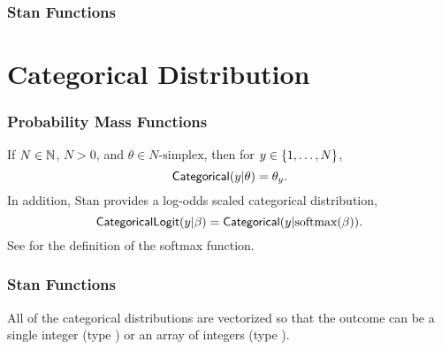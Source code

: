 
\subsubsection{Stan Functions}

\begin{description}
%

%
\end{description}
%
\begin{description}
\end{description}




\section{Categorical Distribution}

\subsubsection{Probability Mass Functions}

If $N \in \nats$, $N > 0$, and $\theta \in \mbox{$N$-simplex}$, then for $y \in
\setlist{1,\ldots,N}$, 
%
\[
\distro{Categorical}(y|\theta) = \theta_y.
\]
%
In addition, Stan provides a log-odds scaled categorical distribution, 
%
\[
\distro{CategoricalLogit}(y|\beta)
= \distro{Categorical}(y|\mbox{softmax}(\beta)).
\]
%
See  for the definition of the softmax function.




\subsubsection{Stan Functions}

All of the categorical distributions are vectorized so that the
outcome  can be a single integer (type ) or an array
of integers (type ).


